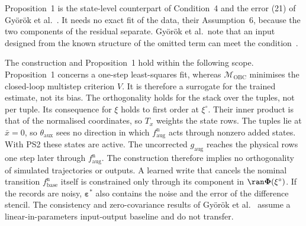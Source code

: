 Proposition~1 is the state-level counterpart of Condition~4 and the error
(21) of Gy\"or\"ok et al.~\cite[Sec.~4.1, Thm.~7]{gyorok2026obc}.
It needs no exact fit of the data, their Assumption~6, because the two
components of the residual separate.
Gy\"or\"ok et al.\ note that an input designed from the known structure of the
omitted term can meet the condition~\cite[Remark~5]{gyorok2026obc}.

The construction and Proposition~1 hold within the following scope.
Proposition~1 concerns a one-step least-squares fit, whereas
$\mathcal M_{\mathrm{OBC}}$ minimises the closed-loop multistep criterion
$V$.
It is therefore a surrogate for the trained estimate, not its bias.
The orthogonality holds for the stack over the tuples, not per tuple.
Its consequence for $\xi$ holds to first order at $\xi^\circ$.
Their inner product is that of the normalised coordinates, so $T_x$ weights
the state rows.
The tuples lie at $\bar x=0$, so $\theta_{\mathrm{aux}}$ sees no direction in
which $f^{\mathrm n}_{\mathrm{aug}}$ acts through nonzero added states.
With PS2 these states are active.
The uncorrected $g_{\mathrm{aug}}$ reaches the physical rows one step later
through $f^{\mathrm n}_{\mathrm{aug}}$.
The construction therefore implies no orthogonality of simulated trajectories
or outputs.
A learned write that cancels the nominal transition
$f^{\mathrm n}_{\mathrm{base}}$ itself is constrained only through its
component in $\ran\boldsymbol\Phi(\xi^\circ)$.
If the records are noisy, $\boldsymbol\varepsilon^*$ also contains the noise
and the error of the difference stencil.
The consistency and zero-covariance results of Gy\"or\"ok et
al.~\cite[Thms.~16, 18]{gyorok2026obc} assume a linear-in-parameters
input-output baseline and do not transfer.
